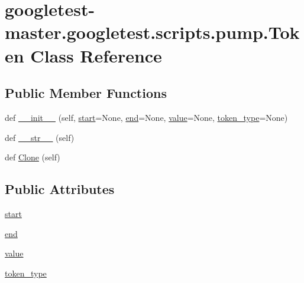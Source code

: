 \hypertarget{classgoogletest-master_1_1googletest_1_1scripts_1_1pump_1_1_token}{}\section{googletest-\/master.googletest.\+scripts.\+pump.\+Token Class Reference}
\label{classgoogletest-master_1_1googletest_1_1scripts_1_1pump_1_1_token}
\subsection*{Public Member Functions}
\begin{DoxyCompactItemize}
\item 
def \mbox{\hyperlink{classgoogletest-master_1_1googletest_1_1scripts_1_1pump_1_1_token_a982ff304265e1efc76d801cb63ca1c1e}{\+\_\+\+\_\+init\+\_\+\+\_\+}} (self, \mbox{\hyperlink{classgoogletest-master_1_1googletest_1_1scripts_1_1pump_1_1_token_a18c61ea49f65c305687e106702368979}{start}}=None, \mbox{\hyperlink{classgoogletest-master_1_1googletest_1_1scripts_1_1pump_1_1_token_aaa06a878c11e81135508f8408a58ad60}{end}}=None, \mbox{\hyperlink{classgoogletest-master_1_1googletest_1_1scripts_1_1pump_1_1_token_a3914656c00d2c5b56044fe66930bacd4}{value}}=None, \mbox{\hyperlink{classgoogletest-master_1_1googletest_1_1scripts_1_1pump_1_1_token_a2bfe1c52eeed48dd6e1db6869ff16847}{token\+\_\+type}}=None)
\item 
def \mbox{\hyperlink{classgoogletest-master_1_1googletest_1_1scripts_1_1pump_1_1_token_a279879370d706e984f1d23122883d962}{\+\_\+\+\_\+str\+\_\+\+\_\+}} (self)
\item 
def \mbox{\hyperlink{classgoogletest-master_1_1googletest_1_1scripts_1_1pump_1_1_token_a05bed2e16aa30c6d76d1360e33ff657a}{Clone}} (self)
\end{DoxyCompactItemize}
\subsection*{Public Attributes}
\begin{DoxyCompactItemize}
\item 
\mbox{\hyperlink{classgoogletest-master_1_1googletest_1_1scripts_1_1pump_1_1_token_a18c61ea49f65c305687e106702368979}{start}}
\item 
\mbox{\hyperlink{classgoogletest-master_1_1googletest_1_1scripts_1_1pump_1_1_token_aaa06a878c11e81135508f8408a58ad60}{end}}
\item 
\mbox{\hyperlink{classgoogletest-master_1_1googletest_1_1scripts_1_1pump_1_1_token_a3914656c00d2c5b56044fe66930bacd4}{value}}
\item 
\mbox{\hyperlink{classgoogletest-master_1_1googletest_1_1scripts_1_1pump_1_1_token_a2bfe1c52eeed48dd6e1db6869ff16847}{token\+\_\+type}}
\end{DoxyCompactItemize}


